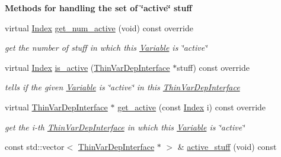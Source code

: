 \begin{Indent}\textbf{ Methods for handling the set of \char`\"{}active\char`\"{} stuff}\par
\begin{DoxyCompactItemize}
\item 
virtual \mbox{\hyperlink{class_s_m_spp__di__unipi__it_1_1_variable_ad53d6229d7ec28555a9c9c2fd9abf773}{Index}} \mbox{\hyperlink{class_s_m_spp__di__unipi__it_1_1_col_variable_aad5c7fae8bf5c960045590272201d88e}{get\+\_\+num\+\_\+active}} (void) const override
\begin{DoxyCompactList}\small\item\em get the number of stuff in which this \mbox{\hyperlink{class_s_m_spp__di__unipi__it_1_1_variable}{Variable}} is \char`\"{}active\char`\"{} \end{DoxyCompactList}\item 
virtual \mbox{\hyperlink{class_s_m_spp__di__unipi__it_1_1_variable_ad53d6229d7ec28555a9c9c2fd9abf773}{Index}} \mbox{\hyperlink{class_s_m_spp__di__unipi__it_1_1_col_variable_a39bd7feba71ae3c1d49c43dd27503f18}{is\+\_\+active}} (\mbox{\hyperlink{class_s_m_spp__di__unipi__it_1_1_thin_var_dep_interface}{Thin\+Var\+Dep\+Interface}} $\ast$stuff) const override
\begin{DoxyCompactList}\small\item\em tells if the given \mbox{\hyperlink{class_s_m_spp__di__unipi__it_1_1_variable}{Variable}} is \char`\"{}active\char`\"{} in this \mbox{\hyperlink{class_s_m_spp__di__unipi__it_1_1_thin_var_dep_interface}{Thin\+Var\+Dep\+Interface}} \end{DoxyCompactList}\item 
virtual \mbox{\hyperlink{class_s_m_spp__di__unipi__it_1_1_thin_var_dep_interface}{Thin\+Var\+Dep\+Interface}} $\ast$ \mbox{\hyperlink{class_s_m_spp__di__unipi__it_1_1_col_variable_a0a386ea1a060cc6aee2856da46a2df5c}{get\+\_\+active}} (const \mbox{\hyperlink{class_s_m_spp__di__unipi__it_1_1_variable_ad53d6229d7ec28555a9c9c2fd9abf773}{Index}} i) const override
\begin{DoxyCompactList}\small\item\em get the i-\/th \mbox{\hyperlink{class_s_m_spp__di__unipi__it_1_1_thin_var_dep_interface}{Thin\+Var\+Dep\+Interface}} in which this \mbox{\hyperlink{class_s_m_spp__di__unipi__it_1_1_variable}{Variable}} is \char`\"{}active\char`\"{} \end{DoxyCompactList}\item 
const std\+::vector$<$ \mbox{\hyperlink{class_s_m_spp__di__unipi__it_1_1_thin_var_dep_interface}{Thin\+Var\+Dep\+Interface}} $\ast$ $>$ \& \mbox{\hyperlink{class_s_m_spp__di__unipi__it_1_1_col_variable_a46dadec266320d9c6060d220aaae6b68}{active\+\_\+stuff}} (void) const

\end{DoxyCompactItemize}
\end{Indent}
